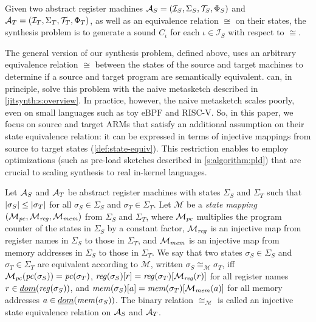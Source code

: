 \begin{definition}\label{def:synthesis-problem}  
Given two abstract register machines $\mathcal{A}_S = (\mathcal{I}_S, \Sigma_S,
\mathcal{T}_S, \Phi_S)$ and $\mathcal{A}_T=(\mathcal{I}_T, \Sigma_T,  \mathcal{T}_T, \Phi_T)$, as well
as an equivalence relation $\cong$ on their states, the \textup{\minicompiler
synthesis problem} is to generate a sound \minicompiler $C_\iota$ for each
$\iota\in\mathcal{I}_S$ with respect to $\cong$.\tighten
\end{definition} 

The general version of our synthesis problem, defined above, uses an arbitrary
equivalence relation $\cong$ between the states of the source and target
machines to determine if a source and target program are semantically
equivalent. \jitsynth can, in principle, solve this problem with the naive
metasketch described in \autoref{jitsynth:s:overview}. In practice, however, the naive
metasketch scales poorly, even on small languages such as toy eBPF and RISC-V\@.
So, in this paper, we focus on source and target ARMs that satisfy an additional
assumption on their state equivalence relation: it can be expressed in terms of
injective mappings from source to target states (\autoref{def:state-equiv}).
This restriction enables \jitsynth to employ optimizations (such as pre-load
sketches described in \autoref{s:algorithm:pld}) that are crucial to scaling
synthesis to real in-kernel languages.\tighten


\begin{definition}\label{def:state-equiv}
Let $\mathcal{A}_S$ and $\mathcal{A}_T$ be abstract register machines with states $\Sigma_S$
and $\Sigma_T$ such that $|\sigma_S|\leq|\sigma_T|$ for all
$\sigma_S\in\Sigma_S$ and $\sigma_T\in\Sigma_T$. Let $\mathcal{M}$ be a
\emph{state mapping} $(\mathcal{M}_\mathit{pc}, \mathcal{M}_\mathit{reg}, \mathcal{M}_\mathit{mem})$
from $\Sigma_S$ and $\Sigma_T$,  where $\mathcal{M}_\mathit{pc}$ multiplies the program
counter of the states in $\Sigma_S$ by a constant factor, $\mathcal{M}_\mathit{reg}$ is
an injective map from register names in $\Sigma_S$ to those in $\Sigma_T$, and
$\mathcal{M}_\mathit{mem}$ is an injective map from memory addresses in $\Sigma_S$ to
those in $\Sigma_T$. We say that two states  $\sigma_S\in\Sigma_S$ and
$\sigma_T\in\Sigma_T$ are equivalent according to $\mathcal{M}$, written
$\sigma_S \cong_\mathcal{M} \sigma_T$, iff $\mathcal{M}_\mathit{pc}(\mathit{pc}(\sigma_S)) =
\mathit{pc}(\sigma_T)$, $\mathit{reg}(\sigma_S)[r] = \mathit{reg}(\sigma_T)[\mathcal{M_\mathit{reg}}(r)]$ for
all register names $r\in\emph{dom}(\mathit{reg}(\sigma_S))$, and $\mathit{mem}(\sigma_S)[a] =
\mathit{mem}(\sigma_T)[\mathcal{M_\mathit{mem}}(a)]$ for all memory addresses
$a\in\emph{dom}(\mathit{mem}(\sigma_S))$. The binary relation $\cong_\mathcal{M}$ is
called an \textup{injective state equivalence relation} on $\mathcal{A}_S$ and
$\mathcal{A}_T$.
\end{definition}

